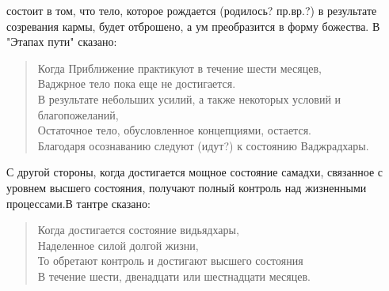 состоит в том, что тело, которое рождается (родилось? пр.вр.?) в результате созревания
кармы, будет отброшено, а ум преобразится в форму божества. В "Этапах пути" сказано:
\begin{verse}
Когда Приближение практикуют в течение шести месяцев, \\
Ваджрное тело пока еще не достигается.\\
В результате небольших усилий, а также некоторых условий и благопожеланий,\\
Остаточное тело, обусловленное концепциями, остается.\\
Благодаря осознаванию следуют (идут?) к состоянию Ваджрадхары.
\end{verse}
С другой стороны, когда достигается мощное состояние самадхи, связанное с уровнем
высшего состояния, получают полный контроль над жизненными процессами.В тантре сказано:
\begin{verse}
Когда достигается состояние видьядхары,\\
Наделенное силой долгой жизни,\\
То обретают контроль и достигают высшего состояния\\
В течение шести, двенадцати или шестнадцати месяцев.
\end{verse}
